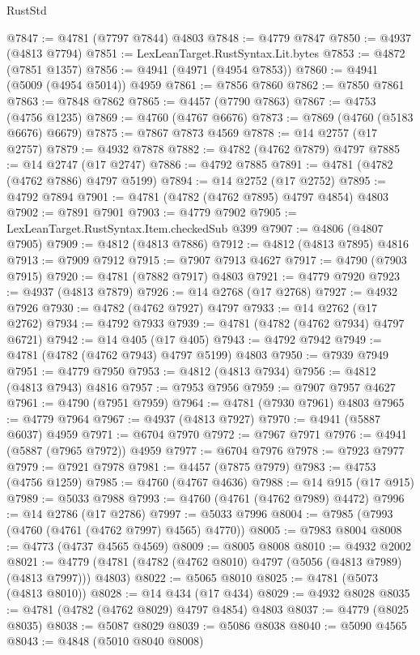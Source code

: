 \begin{lexlean}{RustStd}
\begin{coremodule}
@7847 := @4781 (@7797 @7844) @4803
@7848 := @4779 @7847
@7850 := @4937 (@4813 @7794)
@7851 := LexLeanTarget.RustSyntax.Lit.bytes
@7853 := @4872 (@7851 @1357)
@7856 := @4941 (@4971 (@4954 @7853))
@7860 := @4941 (@5009 (@4954 @5014)) @4959
@7861 := @7856 @7860
@7862 := @7850 @7861
@7863 := @7848 @7862
@7865 := @4457 (@7790 @7863)
@7867 := @4753 (@4756 @1235)
@7869 := @4760 (@4767 @6676)
@7873 := @7869 (@4760 (@5183 @6676) @6679)
@7875 := @7867 @7873 @4569
@7878 := @14 @2757 (@17 @2757)
@7879 := @4932 @7878
@7882 := @4782 (@4762 @7879) @4797
@7885 := @14 @2747 (@17 @2747)
@7886 := @4792 @7885
@7891 := @4781 (@4782 (@4762 @7886) @4797 @5199)
@7894 := @14 @2752 (@17 @2752)
@7895 := @4792 @7894
@7901 := @4781 (@4782 (@4762 @7895) @4797 @4854) @4803
@7902 := @7891 @7901
@7903 := @4779 @7902
@7905 := LexLeanTarget.RustSyntax.Item.checkedSub @399
@7907 := @4806 (@4807 @7905)
@7909 := @4812 (@4813 @7886)
@7912 := @4812 (@4813 @7895) @4816
@7913 := @7909 @7912
@7915 := @7907 @7913 @4627
@7917 := @4790 (@7903 @7915)
@7920 := @4781 (@7882 @7917) @4803
@7921 := @4779 @7920
@7923 := @4937 (@4813 @7879)
@7926 := @14 @2768 (@17 @2768)
@7927 := @4932 @7926
@7930 := @4782 (@4762 @7927) @4797
@7933 := @14 @2762 (@17 @2762)
@7934 := @4792 @7933
@7939 := @4781 (@4782 (@4762 @7934) @4797 @6721)
@7942 := @14 @405 (@17 @405)
@7943 := @4792 @7942
@7949 := @4781 (@4782 (@4762 @7943) @4797 @5199) @4803
@7950 := @7939 @7949
@7951 := @4779 @7950
@7953 := @4812 (@4813 @7934)
@7956 := @4812 (@4813 @7943) @4816
@7957 := @7953 @7956
@7959 := @7907 @7957 @4627
@7961 := @4790 (@7951 @7959)
@7964 := @4781 (@7930 @7961) @4803
@7965 := @4779 @7964
@7967 := @4937 (@4813 @7927)
@7970 := @4941 (@5887 @6037) @4959
@7971 := @6704 @7970
@7972 := @7967 @7971
@7976 := @4941 (@5887 (@7965 @7972)) @4959
@7977 := @6704 @7976
@7978 := @7923 @7977
@7979 := @7921 @7978
@7981 := @4457 (@7875 @7979)
@7983 := @4753 (@4756 @1259)
@7985 := @4760 (@4767 @4636)
@7988 := @14 @915 (@17 @915)
@7989 := @5033 @7988
@7993 := @4760 (@4761 (@4762 @7989) @4472)
@7996 := @14 @2786 (@17 @2786)
@7997 := @5033 @7996
@8004 := @7985 (@7993 (@4760 (@4761 (@4762 @7997) @4565) @4770))
@8005 := @7983 @8004
@8008 := @4773 (@4737 @4565 @4569)
@8009 := @8005 @8008
@8010 := @4932 @2002
@8021 := @4779 (@4781 (@4782 (@4762 @8010) @4797 (@5056 (@4813 @7989) (@4813 @7997))) @4803)
@8022 := @5065 @8010
@8025 := @4781 (@5073 (@4813 @8010))
@8028 := @14 @434 (@17 @434)
@8029 := @4932 @8028
@8035 := @4781 (@4782 (@4762 @8029) @4797 @4854) @4803
@8037 := @4779 (@8025 @8035)
@8038 := @5087 @8029
@8039 := @5086 @8038
@8040 := @5090 @4565
@8043 := @4848 (@5010 @8040 @8008)

\end{coremodule}
\end{lexlean}
